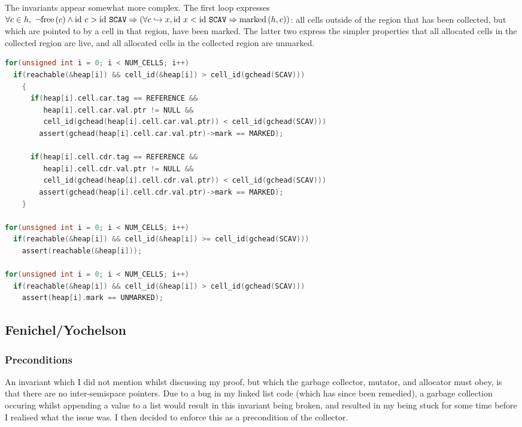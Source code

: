 The invariants appear somewhat more complex. The first loop expresses
$\forall c \in h,\ \lnot\mathrm{free}\left(c\right) \land \mathrm{id}~c > \mathrm{id}~\mathtt{SCAV} \Rightarrow
(\forall c \hookrightarrow x, \mathrm{id}~x < \mathrm{id}~\mathtt{SCAV} \Rightarrow
\mathrm{marked}\left(h, c\right))$: all cells outside of the region that has been
collected, but which are pointed to by a cell in that region, have
been marked. The latter two express the simpler properties that all
allocated cells in the collected region are live, and all allocated
cells in the collected region are unmarked.

\begin{lstlisting}[language=C,caption={Armstrong/Virding Invariants}]
for(unsigned int i = 0; i < NUM_CELLS; i++)
  if(reachable(&heap[i]) && cell_id(&heap[i]) > cell_id(gchead(SCAV)))
    {
      if(heap[i].cell.car.tag == REFERENCE &&
         heap[i].cell.car.val.ptr != NULL &&
         cell_id(gchead(heap[i].cell.car.val.ptr)) < cell_id(gchead(SCAV)))
        assert(gchead(heap[i].cell.car.val.ptr)->mark == MARKED);

      if(heap[i].cell.cdr.tag == REFERENCE &&
         heap[i].cell.cdr.val.ptr != NULL &&
         cell_id(gchead(heap[i].cell.cdr.val.ptr)) < cell_id(gchead(SCAV)))
        assert(gchead(heap[i].cell.cdr.val.ptr)->mark == MARKED);
    }

for(unsigned int i = 0; i < NUM_CELLS; i++)
  if(reachable(&heap[i]) && cell_id(&heap[i]) >= cell_id(gchead(SCAV)))
    assert(reachable(&heap[i]));

for(unsigned int i = 0; i < NUM_CELLS; i++)
  if(reachable(&heap[i]) && cell_id(&heap[i]) > cell_id(gchead(SCAV)))
    assert(heap[i].mark == UNMARKED);
\end{lstlisting}

\subsection{Fenichel/Yochelson}
\label{sec:results-impl-c}

\subsubsection{Preconditions}
\label{sec:results-impl-c-pre}

An invariant which I did not mention whilst discussing my proof, but
which the garbage collector, mutator, and allocator must obey, is that
there are no inter-semispace pointers. Due to a bug in my linked list
code (which has since been remedied), a garbage collection occuring
whilst appending a value to a list would result in this invariant
being broken, and resulted in my being stuck for some time before I
realised what the issue was. I then decided to enforce this as a
precondition of the collector.


